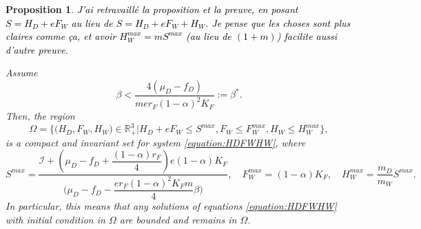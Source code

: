 \documentclass{article}
\newcommand{\cI}{\mathcal{I}}
\newcommand{\vdeux}[1]{\textcolor{black}{#1}}
\newtheorem{prop}[theorem]{Proposition}
\theoremstyle{definition}
\theoremstyle{remark}
\begin{document}
\begin{prop}\label{prop:invariantRegion} 
\vdeux{J'ai retravaillé la proposition et la preuve, en posant $S = H_D + eF_W$ au lieu de $S = H_D + eF_W + H_W$. Je pense que les choses sont plus claires comme ça, et avoir $H_W^{max} = m S^{max}$ (au lieu de $(1 + m)$) facilite aussi d'autre preuve.}

Assume 
\begin{equation*}
\beta < \dfrac{4(\mu_D - f_D)}{m e r_F (1-\alpha)^2 K_F} := \beta^*.
\end{equation*}
Then, the region
$$\Omega = \Big\{\Big(H_D, F_W, H_W \Big) \in \mathbb{R}_+^3  \Big|H_D + eF_W \leq S^{max}, F_W \leq F_W^{max}, H_W \leq H_W^{max} \Big\},$$
is a compact and invariant set for system \eqref{equation:HDFWHW}, 
where
$$
S^{max} = \dfrac{\cI + \left( \mu_D - f_D   +  \dfrac{(1-\alpha)r_F}{4}\right)e(1-\alpha)K_F}{  \Big(\mu_D -f_D - \dfrac{er_F (1-\alpha)^2K_F m}{4} \beta\Big)} ,
\quad
F_W^{max} = (1-\alpha)K_F,
\quad
H_W^{max} = \dfrac{m_D}{m_W} S^{max}.
$$
In particular, this means that any solutions of equations \eqref{equation:HDFWHW} with initial condition in $\Omega$ are bounded and remains in $\Omega$.
\end{prop}
%
\end{document}
